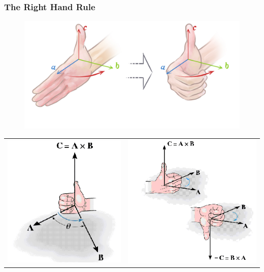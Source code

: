 \documentclass[10pt]{beamer}
\begin{document}
\begin{frame}
\frametitle{The Right Hand Rule}
\begin{figure}
\includegraphics[width = .65\textwidth]{righthandrule1.png}
\end{figure}
\begin{tabular}{cc}
\includegraphics[width = .35\textwidth]{righthandrule2.png}&\includegraphics[width = .35\textwidth]{righthandrule3.png}
\end{tabular}
\end{frame}
\end{document}
